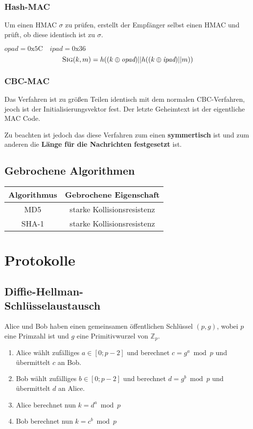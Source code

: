 \documentclass[a4paper,landscape]{article}
\newcommand{\plaint}{\ensuremath{m}}
\newcommand{\sig}{\textsc{Sig}}
\begin{document}
\begin{multicols*}{4}
	\subsubsection{Hash-MAC}
	Um einen HMAC \(\sigma\) zu prüfen, erstellt der Empfänger selbst einen HMAC
	und prüft, ob diese identisch ist zu \(\sigma\). \par
	\(\textit{opad} = \text{0x5C} \quad \textit{ipad} = \text{0x36}\)
	\[\sig(k,\plaint) = h((k \oplus \textit{opad})|| h((k \oplus\textit{ipad})|| m))\]
	\subsubsection{CBC-MAC}
	Das Verfahren ist zu größen Teilen identisch mit dem normalen CBC-Verfahren,
	jeoch ist der Initialisierungsvektor fest. Der letzte Geheimtext ist der
	eigentliche MAC Code. \par
	Zu beachten ist jedoch das diese Verfahren zum einen \textbf{symmertisch}
	ist und zum anderen die \textbf{Länge für die Nachrichten festgesetzt} ist.

	\subsection{Gebrochene Algorithmen}
	\begin{center}
		\begin{tabular}{c| c }
			Algorithmus & Gebrochene Eigenschaft     \\ \hline
			MD5         & starke Kollisionsresistenz \\
			SHA-1       & starke Kollisionsresistenz
		\end{tabular}
	\end{center}

	\section{Protokolle}
	\subsection{Diffie-Hellman-\\Schlüsselaustausch}
	Alice und Bob haben einen gemeinsamen öffentlichen Schlüssel \((p,g)\),
	wobei \(p\) eine Primzahl ist und \(g\) eine Primitivwurzel von
	\(\mathbb{Z}_{p}\).
	\begin{enumerate}
		\item Alice wählt zufälliges $a \in [0;p-2]$ und berechnet $c = g^a \bmod p$
		      und übermittelt $c$ an Bob.
		\item Bob wählt zufälliges $b \in [0;p-2]$ und berechnet $d = g^b \bmod p$
		      und übermittelt $d$ an Alice.
		\item Alice berechnet nun $k = d^a \bmod p$
		\item Bob berechnet nun $k = c^b \bmod p$
	\end{enumerate}


\end{multicols*}
\end{document}
